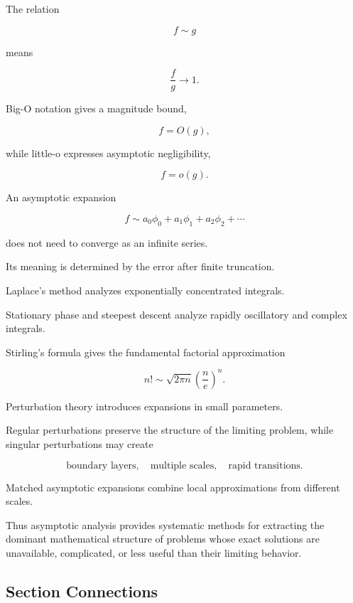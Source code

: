 The relation

\[
\boxed{
f\sim g
}
\]

means

\[
\boxed{
\frac fg\to1.
}
\]

Big-O notation gives a magnitude bound,

\[
\boxed{
f=O(g),
}
\]

while little-o expresses asymptotic negligibility,

\[
\boxed{
f=o(g).
}
\]

An asymptotic expansion

\[
\boxed{
f
\sim
a_0\phi_0
+
a_1\phi_1
+
a_2\phi_2
+\cdots
}
\]

does not need to converge as an infinite series.

Its meaning is determined by the error after finite truncation.

Laplace's method analyzes exponentially concentrated integrals.

Stationary phase and steepest descent analyze rapidly oscillatory and
complex integrals.

Stirling's formula gives the fundamental factorial approximation

\[
\boxed{
n!
\sim
\sqrt{2\pi n}
\left(\frac ne\right)^n.
}
\]

Perturbation theory introduces expansions in small parameters.

Regular perturbations preserve the structure of the limiting problem,
while singular perturbations may create

\[
\boxed{
\text{boundary layers},
\quad
\text{multiple scales},
\quad
\text{rapid transitions}.
}
\]

Matched asymptotic expansions combine local approximations from different
scales.

Thus asymptotic analysis provides systematic methods for extracting the
dominant mathematical structure of problems whose exact solutions are
unavailable, complicated, or less useful than their limiting behavior.

\subsection{Section Connections}
\label{subsec:asymptotic-analysis-connections}

